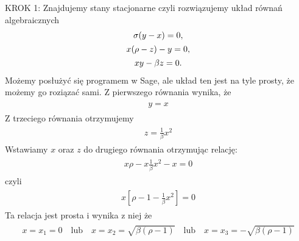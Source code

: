 \documentclass[a4paper,12pt,polish]{sphinxmanual}
\begin{document}
KROK 1: Znajdujemy stany stacjonarne czyli rozwiązujemy układ równań algebraicznych
\label{ch1/chI023:equation-eqn59}\begin{gather}
\begin{split}\sigma (y-x) =0,\end{split}\label{ch1/chI023-eqn59}\\\begin{split}x(\rho - z) -y = 0,\end{split}\notag\\\begin{split}x y - \beta z = 0.\end{split}\notag
\end{gather}
Możemy posłużyć się programem w Sage, ale układ ten jest na tyle prosty, że możemy go roziązać  sami. Z pierwszego równania wynika, że
\label{ch1/chI023:equation-eqn60}\begin{gather}
\begin{split}y=x\end{split}\label{ch1/chI023-eqn60}
\end{gather}
Z trzeciego równania otrzymujemy
\label{ch1/chI023:equation-eqn61}\begin{gather}
\begin{split}z= \frac{1}{\beta} x^2\end{split}\label{ch1/chI023-eqn61}
\end{gather}
Wstawiamy $x$ oraz $z$ do drugiego równania otrzymując relację:
\label{ch1/chI023:equation-eqn62}\begin{gather}
\begin{split}x \rho - x   {\frac{1}{\beta} }x^2 -x=0\end{split}\label{ch1/chI023-eqn62}
\end{gather}
czyli
\label{ch1/chI023:equation-eqn63}\begin{gather}
\begin{split}x [ \rho - 1  - {\frac{1}{\beta} }x^2]=0\end{split}\label{ch1/chI023-eqn63}
\end{gather}
Ta relacja jest prosta i wynika z niej że
\label{ch1/chI023:equation-eqn64}\begin{gather}
\begin{split}x= x_1 = 0 \quad \mbox{lub} \quad x=  x_2 = \sqrt{\beta ( \rho -1)} \quad \mbox{lub} \quad x= x_3 =  - \sqrt{\beta ( \rho -1)}\end{split}\label{ch1/chI023-eqn64}
\end{gather}
\end{document}
